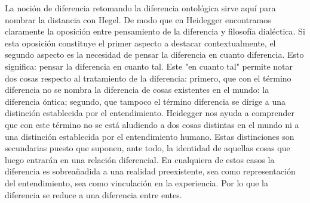 \documentclass{book}
\begin{document}
La noción de diferencia retomando la diferencia ontológica sirve aquí
para nombrar la distancia con Hegel. De modo que en Heidegger
encontramos claramente la oposición entre pensamiento de la diferencia y
filosofía dialéctica. Si esta oposición constituye el primer aspecto a
destacar contextualmente, el segundo aspecto es la necesidad de pensar
la diferencia en cuanto diferencia. Esto significa: pensar la diferencia
en cuanto tal. Este "en cuanto tal" permite notar dos cosas respecto al
tratamiento de la diferencia: primero, que con el término diferencia no
se nombra la diferencia de cosas existentes en el mundo: la diferencia
óntica; segundo, que tampoco el término diferencia se dirige a una
distinción establecida por el entendimiento. Heidegger nos ayuda a
comprender que con este término no se está aludiendo a dos cosas
distintas en el mundo ni a una distinción establecida por el
entendimiento humano. Estas distinciones son secundarias puesto que
suponen, ante todo, la identidad de aquellas cosas que luego entrarán en
una relación diferencial. En cualquiera de estos casos la diferencia es
sobreañadida a una realidad preexistente, sea como representación del
entendimiento, sea como vinculación en la experiencia. Por lo que la
diferencia se reduce a una diferencia entre entes.
\end{document}
